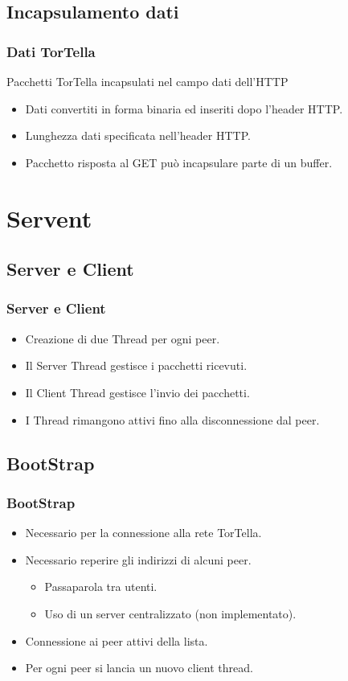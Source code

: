 \documentclass[a4paper,italian,12pt]{beamer}
\begin{document}
		\subsection{Incapsulamento dati}
			\begin{frame}
				\frametitle{Dati TorTella}
				\begin{beamerboxesrounded}[upper=palette primary,lower=palette primary,shadow=true]{ }
					Pacchetti TorTella incapsulati nel campo dati dell'HTTP
				\end{beamerboxesrounded}
				\begin{itemize}
					\item Dati convertiti in forma binaria ed inseriti dopo l'header HTTP.
					\item Lunghezza dati specificata nell'header HTTP.
					\item Pacchetto risposta al GET può incapsulare parte di un buffer.
				\end{itemize}
			\end{frame}
    \section{Servent}
    	\subsection{Server e Client}
			\frame
    		{
   				\frametitle{Server e Client}
    			\begin{itemize}	
	   				\item Creazione di due Thread per ogni peer.
					\item Il Server Thread gestisce i pacchetti ricevuti.
					\item Il Client Thread gestisce l'invio dei pacchetti.
					\item I Thread rimangono attivi fino alla disconnessione dal peer.
				\end{itemize}
   			}
   		\subsection{BootStrap}
   			\frame
	   		{
	   			\frametitle{BootStrap}
	   			\begin{itemize}
	   				\item Necessario per la connessione alla rete TorTella.
	   				\item Necessario reperire gli indirizzi di alcuni peer.
	   					\begin{itemize}
	   						\item Passaparola tra utenti.
	   						\item Uso di un server centralizzato (non implementato).
	   					\end{itemize}
	   				\item Connessione ai peer attivi della lista.
	   				\item Per ogni peer si lancia un nuovo client thread.
	   			\end{itemize}
	   		}
\end{document}

